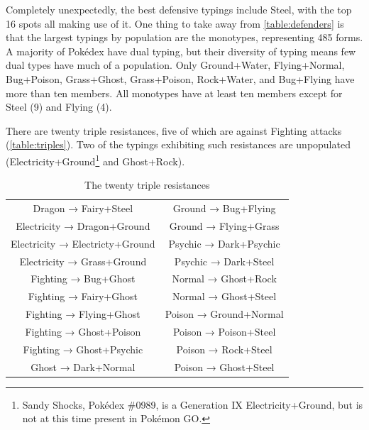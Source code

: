 

Completely unexpectedly, the best defensive typings include Steel, with the top 16 spots all making use of it.
One thing to take away from \autoref{table:defenders} is that the largest
  typings by population are the monotypes, representing 485 forms.
A majority of Pokédex have dual typing, but their diversity of typing means few dual types have much of a population.
Only Ground+Water, Flying+Normal, Bug+Poison, Grass+Ghost, Grass+Poison, Rock+Water, and Bug+Flying
  have more than ten members.
All monotypes have at least ten members except for Steel (9) and Flying (4).



There are twenty triple resistances, five of which are against Fighting attacks (\autoref{table:triples}).
Two of the typings exhibiting such resistances are unpopulated
  (Electricity+Ground\footnote{Sandy Shocks, Pokédex \#0989, is a Generation IX
  Electricity+Ground, but is not at this time present in Pokémon GO.} and Ghost+Rock).
\begin{table}[h]
  \begin{center}
    \begin{tabular}{cc}
Dragon → Fairy+Steel & Ground → Bug+Flying \\
Electricity → Dragon+Ground & Ground → Flying+Grass \\
Electricity → Electricty+Ground & Psychic → Dark+Psychic \\
Electricity → Grass+Ground & Psychic → Dark+Steel \\
Fighting → Bug+Ghost & Normal → Ghost+Rock \\
Fighting → Fairy+Ghost & Normal → Ghost+Steel \\
Fighting → Flying+Ghost & Poison → Ground+Normal \\
Fighting → Ghost+Poison & Poison → Poison+Steel \\
Fighting → Ghost+Psychic & Poison → Rock+Steel \\
Ghost → Dark+Normal & Poison → Ghost+Steel \\
    \end{tabular}
    \caption{The twenty triple resistances}
    \label{table:triples}
  \end{center}
\end{table}

